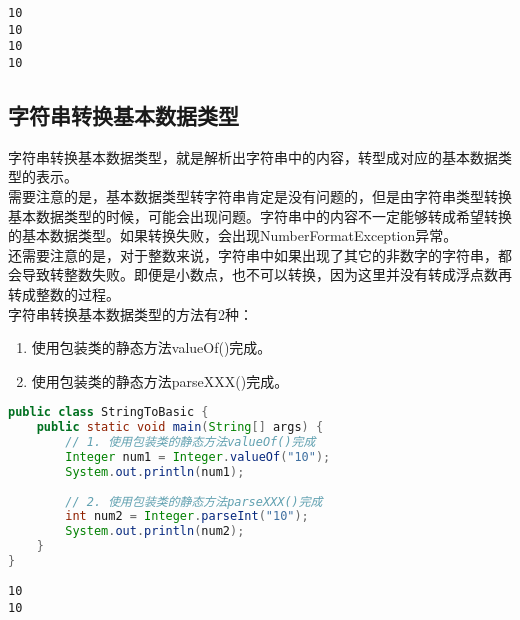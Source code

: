 \begin{tcolorbox}
	\begin{verbatim}
10
10
10
10
	\end{verbatim}
\end{tcolorbox}

\vspace{0.5cm}

\subsection{字符串转换基本数据类型}

字符串转换基本数据类型，就是解析出字符串中的内容，转型成对应的基本数据类型的表示。\\

需要注意的是，基本数据类型转字符串肯定是没有问题的，但是由字符串类型转换基本数据类型的时候，可能会出现问题。字符串中的内容不一定能够转成希望转换的基本数据类型。如果转换失败，会出现NumberFormatException异常。\\

还需要注意的是，对于整数来说，字符串中如果出现了其它的非数字的字符串，都会导致转整数失败。即便是小数点，也不可以转换，因为这里并没有转成浮点数再转成整数的过程。\\

字符串转换基本数据类型的方法有2种：

\begin{enumerate}
	\item 使用包装类的静态方法valueOf()完成。
	\item 使用包装类的静态方法parseXXX()完成。
\end{enumerate}


\begin{lstlisting}[language=Java]
public class StringToBasic {
    public static void main(String[] args) {
        // 1. 使用包装类的静态方法valueOf()完成
        Integer num1 = Integer.valueOf("10");
        System.out.println(num1);
        
        // 2. 使用包装类的静态方法parseXXX()完成
        int num2 = Integer.parseInt("10");
        System.out.println(num2);
    }
}
\end{lstlisting}

\begin{tcolorbox}
	\begin{verbatim}
10
10
	\end{verbatim}
\end{tcolorbox}


